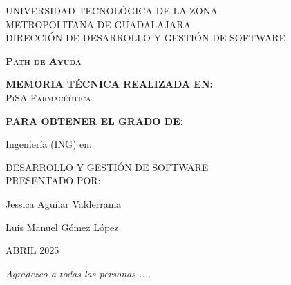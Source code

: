 \documentclass[12pt,letterpaper,spanish, xcolor=table]{report}
\newenvironment{dedication}{\newpage\large\null\em\vskip1in}%
{\vfill}
\begin{document}
\thispagestyle{empty}


\begin{center}
	
 \begin{minipage}[b]{.9\linewidth}
	\begin{center}
		\vspace{0.2in}
		\large{UNIVERSIDAD TECNOLÓGICA DE LA ZONA \\METROPOLITANA DE GUADALAJARA}\\
		\large{DIRECCIÓN DE DESARROLLO Y GESTIÓN DE SOFTWARE}\\
	\end{center}
\end{minipage}
\vspace{0.3in}



\centerline{\hbox{}}

\LARGE{\textbf{\textsc{Path de Ayuda}} }

\vspace{0.3in}
\large{\textbf{MEMORIA TÉCNICA REALIZADA EN:}}
 \\ \textsc{PiSA Farmacéutica}
		
\vspace{0.2in}
\large{\textbf{PARA OBTENER EL GRADO DE:}}

\large{Ingeniería (ING) en:}

\large{DESARROLLO Y GESTIÓN DE SOFTWARE}
\\

\vspace{0.2in}
\large{PRESENTADO POR:}


\textsc{} Jessica Aguilar Valderrama %

\textsc{}Luis Manuel Gómez López

\vspace{0.3in}
\small{ ABRIL 2025}
\end{center}


\newpage



		\thispagestyle{empty}
		
		\begin{dedication}
			Agradezco a todas las personas ....
		\end{dedication}
\end{document}
